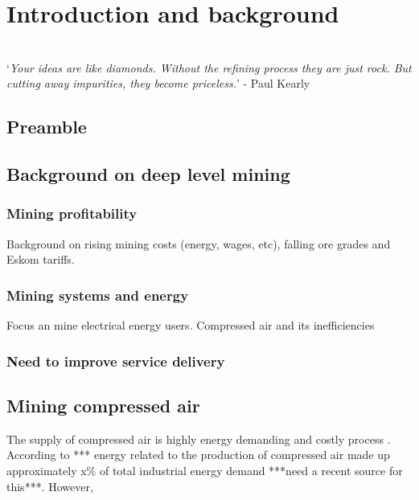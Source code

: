\chapter{Introduction and background}  %
\setcounter{page}{1}
\vspace{38em}

\hrulefill
\\
\enquote*{\textit{Your ideas are like diamonds. Without the refining process they are just rock. But cutting away impurities, they become priceless.}} - Paul Kearly\\
\newpage


\section{Preamble}

\section{Background on deep level mining}

\subsection{Mining profitability}
Background on rising mining costs (energy, wages, etc), falling ore grades and Eskom tariffs.\cite{neingo2016trends}
%	


\subsection{Mining systems and energy}
Focus an mine electrical energy users. Compressed air and its inefficiencies
\subsection{Need to improve service delivery}
\section{Mining compressed air}
The supply of compressed air is highly energy demanding and costly process \cite{padachi2009energy}.  According to *** energy related to the production of compressed air made up approximately x\% of total industrial energy demand ***need a recent source for this***.
However, 
